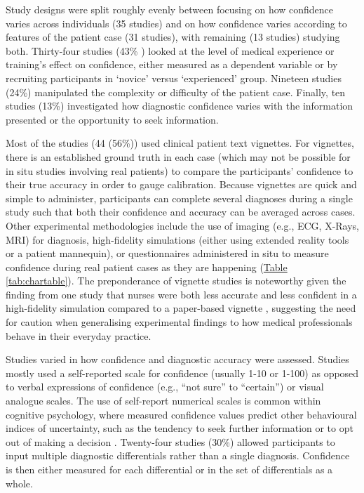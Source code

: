 \documentclass[a4paper, nobind]{templates/ociamthesis}
\begin{document}
\hfill\break
Study designs were split roughly evenly between focusing on how confidence varies across individuals (35 studies) and on how confidence varies according to features of the patient case (31 studies), with remaining (13 studies) studying both. Thirty-four studies (43\% ) looked at the level of medical experience or training's effect on confidence, either measured as a dependent variable or by recruiting participants in `novice' versus `experienced' group. Nineteen studies (24\%) manipulated the complexity or difficulty of the patient case. Finally, ten studies (13\%) investigated how diagnostic confidence varies with the information presented or the opportunity to seek information.

\hfill\break
Most of the studies (44 (56\%)) used clinical patient text vignettes. For vignettes, there is an established ground truth in each case (which may not be possible for in situ studies involving real patients) to compare the participants' confidence to their true accuracy in order to gauge calibration. Because vignettes are quick and simple to administer, participants can complete several diagnoses during a single study such that both their confidence and accuracy can be averaged across cases. Other experimental methodologies include the use of imaging (e.g., ECG, X-Rays, MRI) for diagnosis, high-fidelity simulations (either using extended reality tools or a patient mannequin), or questionnaires administered in situ to measure confidence during real patient cases as they are happening (\hyperref[tab:chartable]{Table \ref{tab:chartable}}). The preponderance of vignette studies is noteworthy given the finding from one study that nurses were both less accurate and less confident in a high-fidelity simulation compared to a paper-based vignette \autocite{yang_effect_2012}, suggesting the need for caution when generalising experimental findings to how medical professionals behave in their everyday practice.

\hfill\break
Studies varied in how confidence and diagnostic accuracy were assessed. Studies mostly used a self-reported scale for confidence (usually 1-10 or 1-100) as opposed to verbal expressions of confidence (e.g., ``not sure'' to ``certain'') or visual analogue scales. The use of self-report numerical scales is common within cognitive psychology, where measured confidence values predict other behavioural indices of uncertainty, such as the tendency to seek further information or to opt out of making a decision \autocite{gherman_neural_2015}. Twenty-four studies (30\%) allowed participants to input multiple diagnostic differentials rather than a single diagnosis. Confidence is then either measured for each differential or in the set of differentials as a whole.
\end{document}
